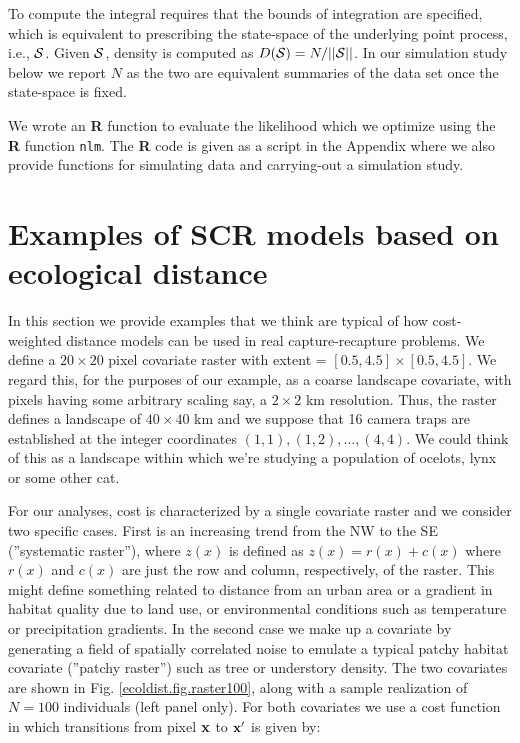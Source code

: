 \documentclass[12pt]{article}
\begin{document}
\begin{spacing}{1.8}
To compute the integral requires that the bounds of integration are
specified, which is equivalent to prescribing the state-space of the
underlying point process, i.e., ${\cal S}$. Given ${\cal S}$, density
is
computed as $D({\cal S}) = N/||{\cal S}||$. In our simulation study
below we report $N$ as the two are equivalent summaries of the data
set once the state-space is fixed.

We wrote an {\bf R} function to evaluate the likelihood which we optimize
using the {\bf R} function \mbox{\tt nlm}.
The {\bf R} code is given as a script in the Appendix where we also
provide functions for simulating data and carrying-out a simulation study.



\section{Examples of SCR models based on ecological distance}

In this section we provide examples that we think are typical of how
cost-weighted distance models can be used in real capture-recapture
problems.  We define a $20 \times 20$ pixel covariate raster with
extent = $[0.5, 4.5] \times [0.5, 4.5]$.  We regard this, for the
purposes of our example, as a coarse landscape covariate, with pixels
having some arbitrary scaling say, a $2 \times 2$ km resolution. Thus,
the raster defines a landscape of $40 \times 40$ km and we suppose
that 16 camera traps are established at the integer coordinates
$(1,1), (1,2), \ldots, (4,4)$. We could think of this as a landscape
within which we're studying a population of ocelots, lynx or some
other cat.

For our analyses, cost is characterized by a single covariate raster
and we consider two specific cases. First is an increasing trend from
the NW to the SE (''systematic raster''), where $z(x)$ is defined as
$z(x) = r(x) + c(x)$ where $r(x)$ and $c(x)$ are just the row and
column, respectively, of the raster.  This might define something
related to distance from an urban area or a gradient in habitat
quality due to land use, or environmental conditions such as
temperature or precipitation gradients.  In the second case we make up
a covariate by generating a field of spatially correlated noise to
emulate a typical patchy habitat covariate (''patchy raster'') such as
tree or understory density. The two covariates are shown in
Fig. \ref{ecoldist.fig.raster100}, along with a sample realization of
$N=100$ individuals (left panel only).  For both covariates we use a
cost function in which transitions from pixel ${\bf x}$ to ${\bf x}'$
is given by:


\end{spacing}
\end{document}
